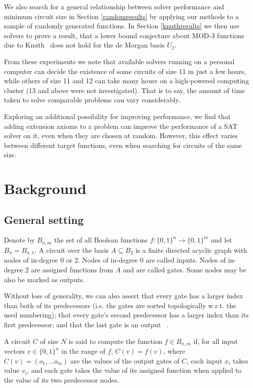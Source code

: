 \documentclass{article}
\begin{document}
We also search for a general relationship between solver performance and minimum circuit size in Section \ref{randomresults} by applying our methods to a sample of randomly generated functions. In Section \ref{knuthresults} we then use solvers to prove a result, that a lower bound conjecture about MOD-3 functions due to Knuth~\cite{knuth15} does not hold for the de Morgan basis $U_2$. 

From these experiments we note that available solvers running on a personal computer can decide the existence of some circuits of size 11 in just a few hours, while others of size 11 and 12 can take many hours on a high-powered computing cluster (13 and above were not investigated). That is to say, the amount of time taken to solve comparable problems can vary considerably.

Exploring an additional possibility for improving performance, we find that adding extension axioms to a problem can improve the performance of a SAT solver on it, even when they are chosen at random. However, this effect varies between different target functions, even when searching for circuits of the same size.

\section{Background}

\subsection{General setting}

Denote by \(B_{n,m}\) the set of all Boolean functions \(f: \{0,1\}^n \to \{0,1\}^m\) and let \(B_n = B_{n,1}\). A circuit over the basis \(A \subseteq B_2\) is a finite directed acyclic graph with nodes of in-degree 0 or 2. Nodes of in-degree 0 are called inputs. Nodes of in-degree 2 are assigned functions from \(A\) and are called gates. Some nodes may be also be marked as outputs.

Without loss of generality, we can also assert that every gate has a larger index than both of its predecessors (i.e. the gates are sorted topologically w.r.t. the used numbering); that every gate's second predecessor has a larger index than its first predecessor; and that the last gate is an output ~\cite{kulikov}.

A circuit \(C\) of size $N$ is said to compute the function \(f\in B_{n,m}\) if, for all input vectors \(v\in\{0,1\}^n\) in the range of \(f\), \(C(v)=f(v)\), where \(C(v) = (o_1,...o_m)\) are the values of the output gates of \(C\), each input \(x_i\) takes value \(v_i\), and each gate takes the value of its assigned function when applied to the value of its two predecessor nodes.
\end{document}
